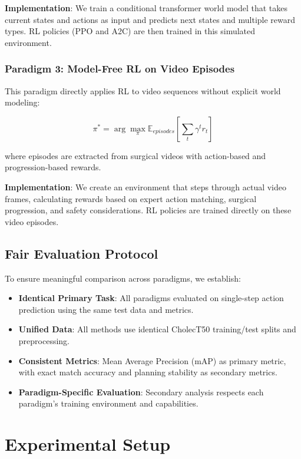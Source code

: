 \documentclass[conference]{IEEEtran}
\begin{document}
\textbf{Implementation}: We train a conditional transformer world model that takes current states and actions as input and predicts next states and multiple reward types. RL policies (PPO and A2C) are then trained in this simulated environment.

\subsubsection{Paradigm 3: Model-Free RL on Video Episodes}

This paradigm directly applies RL to video sequences without explicit world modeling:

\begin{equation}
\pi^* = \arg\max_\pi \mathbb{E}_{episodes}\left[\sum_t \gamma^t r_t\right]
\end{equation}

where episodes are extracted from surgical videos with action-based and progression-based rewards.

\textbf{Implementation}: We create an environment that steps through actual video frames, calculating rewards based on expert action matching, surgical progression, and safety considerations. RL policies are trained directly on these video episodes.

\subsection{Fair Evaluation Protocol}

To ensure meaningful comparison across paradigms, we establish:

\begin{itemize}
\item \textbf{Identical Primary Task}: All paradigms evaluated on single-step action prediction using the same test data and metrics.
\item \textbf{Unified Data}: All methods use identical CholecT50 training/test splits and preprocessing.
\item \textbf{Consistent Metrics}: Mean Average Precision (mAP) as primary metric, with exact match accuracy and planning stability as secondary metrics.
\item \textbf{Paradigm-Specific Evaluation}: Secondary analysis respects each paradigm's training environment and capabilities.
\end{itemize}

\section{Experimental Setup}
\end{document}
